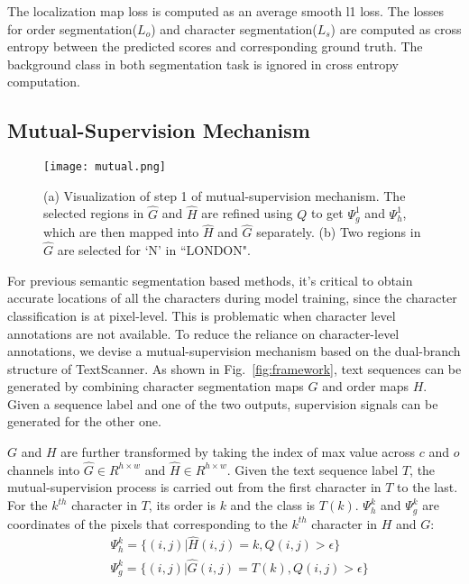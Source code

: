 \documentclass[letterpaper]{article} \usepackage{aaai20}  \usepackage{times}  \usepackage{helvet} \usepackage{courier}  \usepackage[hyphens]{url}  \usepackage{graphicx} \urlstyle{rm} \def\UrlFont{\rm}  \usepackage{graphicx}  \frenchspacing  \setlength{\pdfpagewidth}{8.5in}  \setlength{\pdfpageheight}{11in}
\begin{document}
The localization map loss is computed as an average smooth l1 loss. The losses for order segmentation($L_{o}$) and character segmentation($L_{s}$) are computed as cross entropy between the predicted scores and corresponding ground truth. The background class in both segmentation task is ignored in cross entropy computation.


\subsection{Mutual-Supervision Mechanism} \label{weakly-supervise}

\begin{figure*}[t]
\centering
\texttt{[image: mutual.png]}
\caption{(a) Visualization of step 1 of mutual-supervision mechanism. The selected regions in $\hat{G}$ and $\hat{H}$ are refined using $Q$ to get ${\Psi}_{g}^{1}$ and ${\Psi}_{h}^{1}$, which are then mapped into $\hat{H}$ and $\hat{G}$ separately. (b) Two regions in $\hat{G}$ are selected for `N' in ``LONDON".}
\label{fig:mutual supervision}
\end{figure*}


 For previous semantic segmentation based methods, it's critical to obtain accurate locations of all the characters during model training, since the character classification is at pixel-level.  This is problematic when character level annotations are not available.  To reduce the reliance on character-level annotations, we devise a mutual-supervision mechanism based on the dual-branch structure of TextScanner. As shown in Fig.~\ref{fig:framework}, text sequences can be generated by combining character segmentation maps $G$ and order maps $H$. Given a sequence label and one of the two outputs, supervision signals can be generated for the other one.

 ${G}$ and ${H}$ are further transformed by taking the index of max value across $c$ and $o$ channels into $\hat{G} \in R^{h \times w}$ and $\hat{H} \in R^{h \times w}$. Given the text sequence label $T$, the mutual-supervision process is carried out from the first character in $T$ to the last. For the $k^{th}$ character in $T$, its order is $k$ and the class is $T(k)$. ${\Psi}_{h}^{k}$ and ${\Psi}_{g}^{k}$ are coordinates of the pixels that corresponding to the $k^{th}$ character in $H$ and $G$:
\begin{equation}
    \begin{split}
    &{\Psi}_{h}^{k} = \{(i,j) | \hat{H}(i,j) = k, Q(i,j)>\epsilon  \} \\
    &{\Psi}_{g}^{k} = \{(i,j) | \hat{G}(i,j) = T(k),  Q(i,j)>\epsilon\}
    \end{split}
\end{equation}
\end{document}
